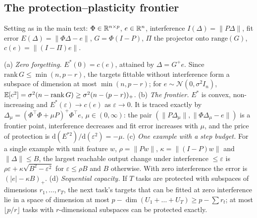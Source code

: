 \subsection{The protection--plasticity frontier}\label{app:frontier}
Setting as in the main text: $\Phi\in\mathbb{R}^{n\times p}$, $e\in\mathbb{R}^n$, interference $I(\Delta)=\|P\Delta\|$, fit error $E(\Delta)=\|\Phi\Delta-e\|$, $G=\Phi(I-P)$, $\Pi$ the projector onto $\mathrm{range}(G)$, $c(e)=\|(I-\Pi)e\|$.
\begin{theorem}\label{thm:frontierfull}
(a) \emph{Zero forgetting.} $E^\ast(0)=c(e)$, attained by $\Delta=G^{+}e$. Since $\mathrm{rank}\,G\le\min(n,p-r)$, the targets fittable without interference form a subspace of dimension at most $\min(n,p-r)$; for $e\sim\mathcal N(0,\sigma^2I_n)$, $\mathbb{E}[c^2]=\sigma^2(n-\mathrm{rank}\,G)\ge\sigma^2(n-(p-r))_+$.
(b) \emph{The frontier.} $E^\ast$ is convex, non-increasing and $E^\ast(\varepsilon)\to c(e)$ as $\varepsilon\to0$. It is traced exactly by $\Delta_\mu=(\Phi^\top\Phi+\mu P)^{+}\Phi^\top e$, $\mu\in(0,\infty)$: the pair $(\|P\Delta_\mu\|,\|\Phi\Delta_\mu-e\|)$ is a frontier point, interference decreases and fit error increases with $\mu$, and the price of protection is $\mathrm d(E^{\ast2})/\mathrm d(\varepsilon^2)=-\mu$.
(c) \emph{One example with a step budget.} For a single example with unit feature $w$, $\rho=\|Pw\|$, $\kappa=\|(I-P)w\|$ and $\|\Delta\|\le B$, the largest reachable output change under interference $\le\varepsilon$ is $\rho\varepsilon+\kappa\sqrt{B^2-\varepsilon^2}$ for $\varepsilon\le\rho B$ and $B$ otherwise. With zero interference the error is $(|e|-\kappa B)_+$.
(d) \emph{Sequential capacity.} If $T$ tasks are protected with subspaces of dimensions $r_1,\dots,r_T$, the next task's targets that can be fitted at zero interference lie in a space of dimension at most $p-\dim(U_1+\dots+U_T)\ge p-\sum r_t$; at most $\lfloor p/r\rfloor$ tasks with $r$-dimensional subspaces can be protected exactly.
\end{theorem}
